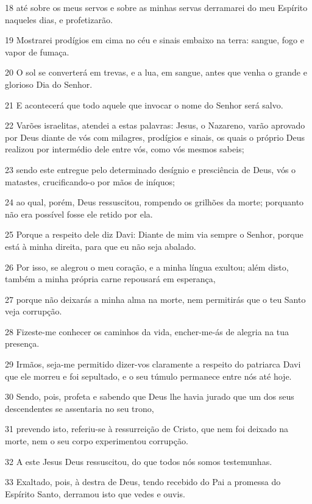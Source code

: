 \par 18 até sobre os meus servos e sobre as minhas servas derramarei do meu Espírito naqueles dias, e profetizarão.
\par 19 Mostrarei prodígios em cima no céu e sinais embaixo na terra: sangue, fogo e vapor de fumaça.
\par 20 O sol se converterá em trevas, e a lua, em sangue, antes que venha o grande e glorioso Dia do Senhor.
\par 21 E acontecerá que todo aquele que invocar o nome do Senhor será salvo.
\par 22 Varões israelitas, atendei a estas palavras: Jesus, o Nazareno, varão aprovado por Deus diante de vós com milagres, prodígios e sinais, os quais o próprio Deus realizou por intermédio dele entre vós, como vós mesmos sabeis;
\par 23 sendo este entregue pelo determinado desígnio e presciência de Deus, vós o matastes, crucificando-o por mãos de iníquos;
\par 24 ao qual, porém, Deus ressuscitou, rompendo os grilhões da morte; porquanto não era possível fosse ele retido por ela.
\par 25 Porque a respeito dele diz Davi: Diante de mim via sempre o Senhor, porque está à minha direita, para que eu não seja abalado.
\par 26 Por isso, se alegrou o meu coração, e a minha língua exultou; além disto, também a minha própria carne repousará em esperança,
\par 27 porque não deixarás a minha alma na morte, nem permitirás que o teu Santo veja corrupção.
\par 28 Fizeste-me conhecer os caminhos da vida, encher-me-ás de alegria na tua presença.
\par 29 Irmãos, seja-me permitido dizer-vos claramente a respeito do patriarca Davi que ele morreu e foi sepultado, e o seu túmulo permanece entre nós até hoje.
\par 30 Sendo, pois, profeta e sabendo que Deus lhe havia jurado que um dos seus descendentes se assentaria no seu trono,
\par 31 prevendo isto, referiu-se à ressurreição de Cristo, que nem foi deixado na morte, nem o seu corpo experimentou corrupção.
\par 32 A este Jesus Deus ressuscitou, do que todos nós somos testemunhas.
\par 33 Exaltado, pois, à destra de Deus, tendo recebido do Pai a promessa do Espírito Santo, derramou isto que vedes e ouvis.
